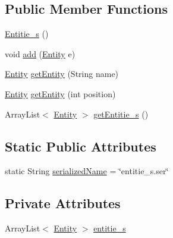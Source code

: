 \subsection*{Public Member Functions}
\begin{DoxyCompactItemize}
\item 
\hyperlink{classit_1_1isislab_1_1masonassisteddocumentation_1_1_o_d_d_1_1_entitie__s_aa18b5cb6d2c12d74c50795ca30dbd20b}{Entitie\-\_\-s} ()
\item 
void \hyperlink{classit_1_1isislab_1_1masonassisteddocumentation_1_1_o_d_d_1_1_entitie__s_ab1ea863a83a1cef5b14d023d74ca5c74}{add} (\hyperlink{classit_1_1isislab_1_1masonassisteddocumentation_1_1_o_d_d_1_1_entity}{Entity} e)
\item 
\hyperlink{classit_1_1isislab_1_1masonassisteddocumentation_1_1_o_d_d_1_1_entity}{Entity} \hyperlink{classit_1_1isislab_1_1masonassisteddocumentation_1_1_o_d_d_1_1_entitie__s_a9c7c43af2400b71e04b30bff2ac8befd}{get\-Entity} (String name)
\item 
\hyperlink{classit_1_1isislab_1_1masonassisteddocumentation_1_1_o_d_d_1_1_entity}{Entity} \hyperlink{classit_1_1isislab_1_1masonassisteddocumentation_1_1_o_d_d_1_1_entitie__s_afde17156aab664823884152ee744da07}{get\-Entity} (int position)
\item 
Array\-List$<$ \hyperlink{classit_1_1isislab_1_1masonassisteddocumentation_1_1_o_d_d_1_1_entity}{Entity} $>$ \hyperlink{classit_1_1isislab_1_1masonassisteddocumentation_1_1_o_d_d_1_1_entitie__s_a02710154b647f14efe2d29e898786d5f}{get\-Entitie\-\_\-s} ()
\end{DoxyCompactItemize}
\subsection*{Static Public Attributes}
\begin{DoxyCompactItemize}
\item 
static String \hyperlink{classit_1_1isislab_1_1masonassisteddocumentation_1_1_o_d_d_1_1_entitie__s_a0ee8a24609c0cd5b585ca681a5e61681}{serialized\-Name} = \char`\"{}entitie\-\_\-s.\-ser\char`\"{}
\end{DoxyCompactItemize}
\subsection*{Private Attributes}
\begin{DoxyCompactItemize}
\item 
Array\-List$<$ \hyperlink{classit_1_1isislab_1_1masonassisteddocumentation_1_1_o_d_d_1_1_entity}{Entity} $>$ \hyperlink{classit_1_1isislab_1_1masonassisteddocumentation_1_1_o_d_d_1_1_entitie__s_a914d5c92a09e78d84f3e567576f015d2}{entitie\-\_\-s}
\end{DoxyCompactItemize}
